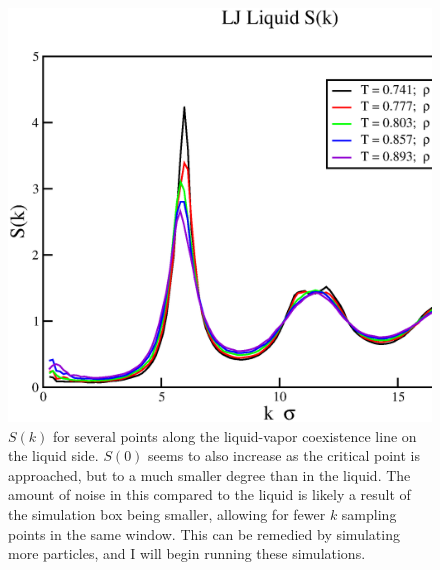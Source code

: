 \documentclass[12pt]{article}
\begin{document}
\begin{figure}[H]
    \centering
    \includegraphics[width=6in]{032019LJLiquidAlongDome.eps}
    \caption*{$S(k)$ for several points along the liquid-vapor coexistence line on the liquid side. $S(0)$ seems to also increase as the critical point is approached, but to a much smaller degree than in the liquid. The amount of noise in this compared to the liquid is likely a result of the simulation box being smaller, allowing for fewer $k$ sampling points in the same window. This can be remedied by simulating more particles, and I will begin running these simulations.}
\end{figure}
\end{document}
